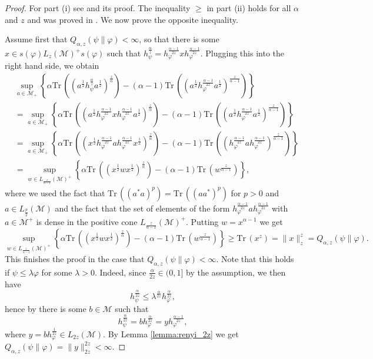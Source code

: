 \documentclass[12pt]{article}
\theoremstyle{definition}
\theoremstyle{remark}
\numberwithin{equation}{section}
\def\Me{\mathcal M}
\def \Tr{\mathrm{Tr}\,}
\begin{document}
\begin{proof} For part (i) see \cite[Theorem 1 (vi)]{kato2023onrenyi} and its proof. The
inequality $\ge$ in part (ii) holds for all $\alpha$ and $z$ and was proved in
\cite[Theorem 2 (vi)]{kato2023onrenyi}. We now prove the opposite inequality. 

Assume first that $Q_{\alpha,z}(\psi\|\varphi)<\infty$, so that there is some $x\in
s(\varphi)L_z(\Me)^+s(\varphi)$ such that
$h_\psi^{\frac{\alpha}{z}}=h_\varphi^{\frac{\alpha-1}{2z}}xh_\varphi^{\frac{\alpha-1}{2z}}$. Plugging this
into the right hand side, we obtain
\begin{align*}
&\sup_{a\in \Me_+} \left\{\alpha
\Tr\left((a^{\frac12}h_\psi^{\frac{\alpha}{z}}a^{\frac12})^{\frac{z}{\alpha}}\right)-(\alpha-1)
\Tr\left((a^{\frac12}h_\varphi^{\frac{\alpha-1}{2z}}a^{\frac12})^{\frac{z}{\alpha-1}}\right) \right\}\\
&=\sup_{a\in \Me_+} \left\{\alpha
\Tr\left((a^{\frac12}h_\varphi^{\frac{\alpha-1}{2z}}xh_\varphi^{\frac{\alpha-1}{2z}}
a^{\frac12})^{\frac{z}{\alpha}}\right)-(\alpha-1)
\Tr\left((a^{\frac12}h_\varphi^{\frac{\alpha-1}{2z}}a^{\frac12})^{\frac{z}{\alpha-1}}\right) \right\}\\
&=\sup_{a\in \Me_+} \left\{\alpha
\Tr\left((x^{\frac12}h_\varphi^{\frac{\alpha-1}{2z}}ah_\varphi^{\frac{\alpha-1}{2z}}
x^{\frac12})^{\frac{z}{\alpha}}\right)-(\alpha-1)
\Tr\left((h_\varphi^{\frac{\alpha-1}{2z}}a h_\varphi^{\frac{\alpha-1}{2z}}
)^{\frac{z}{\alpha-1}}\right)
\right\}\\
&=\sup_{w\in L_{\frac{z}{\alpha-1}}(\Me)^+} \left\{\alpha
\Tr\left((x^{\frac12}wx^{\frac12})^{\frac{z}{\alpha}}\right)-(\alpha-1)
\Tr\left(w^{\frac{z}{\alpha-1}}\right)
\right\},
\end{align*}
where we used the fact that $\Tr \left((a^*a)^p\right)=\Tr \left((aa^*)^p\right)$ for
$p>0$ and $a\in L_{\frac{p}{2}}(\Me)$ and the fact that the set of
elements of the form $h_\varphi^{\frac{\alpha-1}{2z}}a h_\varphi^{\frac{\alpha-1}{2z}}$ with $a \in
\Me^+$ is dense in the positive cone $L_{\frac{z}{\alpha-1}}(\Me)^+$. Putting $w=x^{\alpha-1}$ we
get
\[
\sup_{w\in L_{\frac{z}{\alpha-1}}(\Me)^+} \left\{\alpha
\Tr\left((x^{\frac12}wx^{\frac12})^{\frac{z}{\alpha}}\right)-(\alpha-1)
\Tr\left(w^{\frac{z}{\alpha-1}}\right)
\right\}\ge \Tr(x^z)=\|x\|_z^z= Q_{\alpha,z}(\psi\|\varphi).
\]
This finishes the proof in the case that $Q_{\alpha,z}(\psi\|\varphi)<\infty$.  Note that
this holds if $\psi\le \lambda\varphi$ for some $\lambda>0$. Indeed, since
$\frac{\alpha}{2z}\in (0,1]$ by the assumption, we then have 
\[
h_\psi^{\frac{\alpha}{2z}}\le \lambda^{\frac{\alpha}{2z}}h_\varphi^{\frac{\alpha}{2z}},
\]
hence by \cite[Lemma A.58]{hiai2021quantum} there is some $b\in \Me$ such that 
\[
h_\psi^{\frac{\alpha}{2z}}=bh_\varphi^{\frac{\alpha}{2z}}=yh_\varphi^{\frac{\alpha-1}{2z}},
\]
where $y=bh_\varphi^{\frac{1}{2z}}\in L_{2z}(\Me)$. By Lemma \ref{lemma:renyi_2z} we get 
$Q_{\alpha,z}(\psi\|\varphi)=\|y\|_{2z}^{2z}<\infty$. 


\end{proof}
\end{document}
